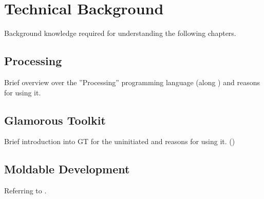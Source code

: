 
\chapter{Technical Background} \label{ch_background}
Background knowledge required for understanding the following chapters.

\section{Processing}
Brief overview over the ''Processing'' programming language (along \cite{Cas14}) and reasons for using it.

\section{Glamorous Toolkit}
Brief introduction into GT for the uninitiated and reasons for using it. (\cite{Gir23})

\section{Moldable Development}
Referring to \cite{Nie24}.
